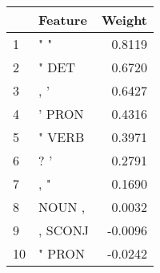 \begin{tabular}{llr}
\toprule
{} &  Feature &  Weight \\
\midrule
1  &      " " &  0.8119 \\
2  &    " DET &  0.6720 \\
3  &      , ' &  0.6427 \\
4  &   ' PRON &  0.4316 \\
5  &   " VERB &  0.3971 \\
6  &      ? ' &  0.2791 \\
7  &      , " &  0.1690 \\
8  &   NOUN , &  0.0032 \\
9  &  , SCONJ & -0.0096 \\
10 &   " PRON & -0.0242 \\
\bottomrule
\end{tabular}
